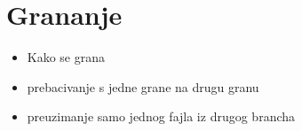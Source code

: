 \chapter*{Grananje}

\begin{itemize}
   \item Kako se grana
   \item prebacivanje s jedne grane na drugu granu
   \item preuzimanje samo jednog fajla iz drugog brancha
\end{itemize}


